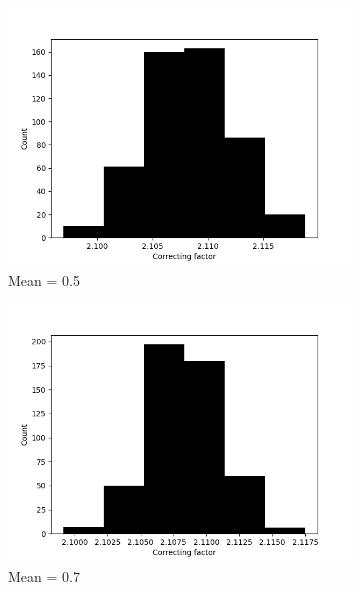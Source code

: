 \begin{figure}
\begin{subfigure}[t]{0.45\textwidth}
        \centering
        \includegraphics[width=1\textwidth]{./images/robust_approx/results_2d_high_rank_figures/correcting_factors_hadamard_mean_10_05.png}
        \caption{Mean = 0.5}
      \end{subfigure}
      \begin{subfigure}[t]{0.45\textwidth}
        \centering
        \includegraphics[width=1\textwidth]{./images/robust_approx/results_2d_high_rank_figures/correcting_factors_hadamard_mean_10_07.png}
        \caption{Mean = 0.7}
      \end{subfigure}
      \begin{subfigure}[t]{0.45\textwidth}
        \centering

\end{subfigure}
\end{figure}
